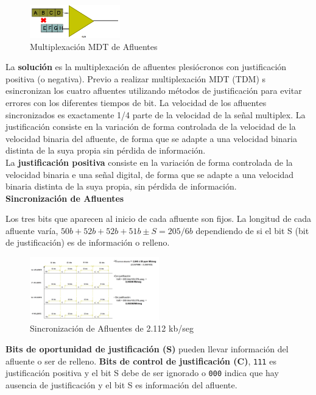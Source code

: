 \documentclass[10pt,portrait, twocolumn]{article}
\begin{document}
\begin{figure}[!ht]
	\centering
     \includegraphics[width=0.35\textwidth]{Problemas}
      \caption{Multiplexación MDT de Afluentes}
      \label{fig:Regiones de frecuencias}
  \end{figure}

La \textbf{solución} es la multiplexación de afluentes plesiócronos con justificación positiva (o negativa). Previo a realizar multiplexación MDT (TDM) s esincronizan los cuatro afluentes utilizando métodos de justificación para evitar errores con los diferentes tiempos de bit. La velocidad de los afluentes sincronizados es exactamente 1/4 parte de la velocidad de la señal multiplex. La justificación consiste en la variación de forma controlada de la velocidad de la velocidad binaria del afluente, de forma que se adapte a una velocidad binaria distinta de la suya propia sin pérdida de información.\\

La \textbf{justificación positiva} consiste en la variación de forma controlada de la velocidad binaria e una señal digital, de forma que se adapte a una velocidad binaria distinta de la suya propia, sin pérdida de información.\\

\textbf{Sincronización de Afluentes}

Los tres bits que aparecen al inicio de cada afluente son fijos. La longitud de cada afluente varía, $50b + 52b + 52b + 51b \pm S = 205/6b$ dependiendo de si el bit S (bit de justificación) es de información o relleno.\\

\begin{figure}[!ht]
	\centering
     \includegraphics[width=0.5\textwidth]{sync}
      \caption{Sincronización de Afluentes de 2.112 kb/seg}
      \label{fig:Regiones de frecuencias}
  \end{figure}
  
  
\textbf{Bits de oportunidad de justificación (S)} pueden llevar información del afluente o ser de relleno. \textbf{Bits de control de justificación (C)}, \texttt{111} es justificación positiva y el bit S debe de ser ignorado o \texttt{000} indica que hay ausencia de justificación y el bit S es información del afluente.\\
\end{document}
